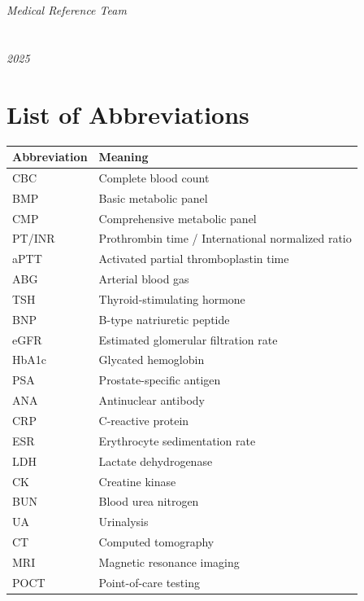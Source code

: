 \documentclass[12pt,oneside]{book}
\begin{document}
\vspace{1cm}
\noindent \textit{Medical Reference Team}\\\\\\\textit{2025}

\setcounter{tocdepth}{0}
\tableofcontents

\chapter*{List of Abbreviations}

\begin{footnotesize}
\begin{longtable}{@{}ll@{}}
\toprule
\textbf{Abbreviation} & \textbf{Meaning} \\
\midrule
\endhead
CBC & Complete blood count \\
BMP & Basic metabolic panel \\
CMP & Comprehensive metabolic panel \\
PT/INR & Prothrombin time / International normalized ratio \\
aPTT & Activated partial thromboplastin time \\
ABG & Arterial blood gas \\
TSH & Thyroid-stimulating hormone \\
BNP & B-type natriuretic peptide \\
eGFR & Estimated glomerular filtration rate \\
HbA1c & Glycated hemoglobin \\
PSA & Prostate-specific antigen \\
ANA & Antinuclear antibody \\
CRP & C-reactive protein \\
ESR & Erythrocyte sedimentation rate \\
LDH & Lactate dehydrogenase \\
CK & Creatine kinase \\
BUN & Blood urea nitrogen \\
UA & Urinalysis \\
CT & Computed tomography \\
MRI & Magnetic resonance imaging \\
POCT & Point-of-care testing \\
\bottomrule
\end{longtable}
\end{footnotesize}
\end{document}
